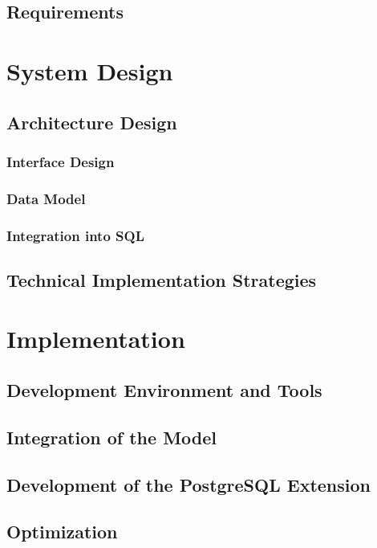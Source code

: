 \documentclass{article}
\begin{document}
\subsection{Requirements}

\section{System Design}

\subsection{Architecture Design}
\subsubsection{Interface Design}
\subsubsection{Data Model}
\subsubsection{Integration into SQL}

\subsection{Technical Implementation Strategies}

\newpage

\section{Implementation}

\subsection{Development Environment and Tools}

\subsection{Integration of the Model}


\subsection{Development of the PostgreSQL Extension}


\subsection{Optimization}
\end{document}
